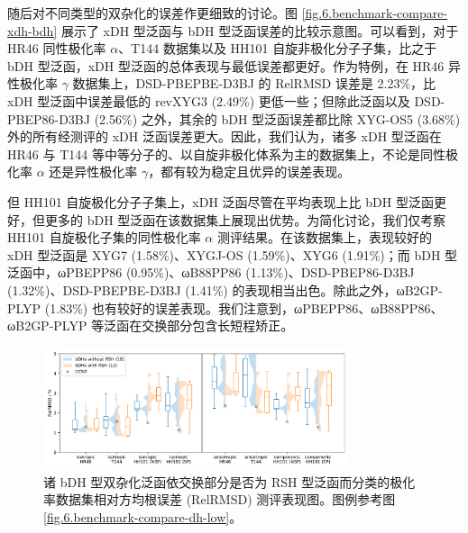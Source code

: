 随后对不同类型的双杂化的误差作更细致的讨论。图 \ref{fig.6.benchmark-compare-xdh-bdh} 展示了 xDH 型泛函与 bDH 型泛函误差的比较示意图。可以看到，对于 HR46 同性极化率 $\alpha$、T144 数据集以及 HH101 自旋非极化分子子集，比之于 bDH 型泛函，xDH 型泛函的总体表现与最低误差都更好。作为特例，在 HR46 异性极化率 $\gamma$ 数据集上，DSD-PBEPBE-D3BJ 的 RelRMSD 误差是 2.23\%，比 xDH 型泛函中误差最低的 revXYG3 (2.49\%) 更低一些；但除此泛函以及 DSD-PBEP86-D3BJ (2.56\%) 之外，其余的 bDH 型泛函误差都比除 XYG-OS5 (3.68\%) 外的所有经测评的 xDH 泛函误差更大。因此，我们认为，诸多 xDH 型泛函在 HR46 与 T144 等中等分子的、以自旋非极化体系为主的数据集上，不论是同性极化率 $\alpha$ 还是异性极化率 $\gamma$，都有较为稳定且优异的误差表现。

但 HH101 自旋极化分子子集上，xDH 泛函尽管在平均表现上比 bDH 型泛函更好，但更多的 bDH 型泛函在该数据集上展现出优势。为简化讨论，我们仅考察 HH101 自旋极化子集的同性极化率 $\alpha$ 测评结果。在该数据集上，表现较好的 xDH 型泛函是 XYG7 (1.58\%)、XYGJ-OS (1.59\%)、XYG6 (1.91\%)；而 bDH 型泛函中，ωPBEPP86 (0.95\%)、ωB88PP86 (1.13\%)、DSD-PBEP86-D3BJ (1.32\%)、DSD-PBEPBE-D3BJ (1.41\%) 的表现相当出色。除此之外，ωB2GP-PLYP (1.83\%) 也有较好的误差表现。我们注意到，ωPBEPP86、ωB88PP86、ωB2GP-PLYP 等泛函在交换部分包含长短程矫正。

\begin{figure}[!t]
    \centering
    \includegraphics[width=0.8\textwidth]{assets/benchmark-compare-dh-rsh.pdf}
    \caption[bDH 依 RSH 分类的极化率 RelRMSD 测评表现图]{诸 bDH 型双杂化泛函依交换部分是否为 RSH 型泛函而分类的极化率数据集相对方均根误差 (RelRMSD) 测评表现图。图例参考图 \ref{fig.6.benchmark-compare-dh-low}。}
    \label{fig.6.benchmark-compare-dh-rsh}
\end{figure}

